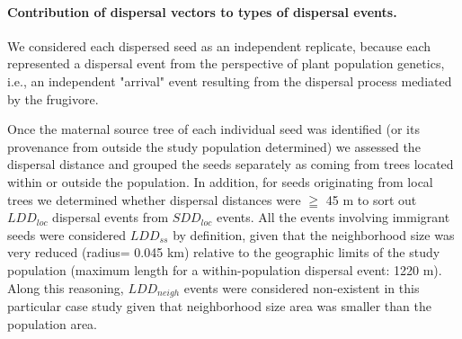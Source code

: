 \documentclass[a4paper, 12pt]{article}
\begin{document}
\begin{linenumbers}
\paragraph*{Contribution of dispersal vectors to types of dispersal events.} 
We considered each dispersed seed as an independent replicate, because each represented a dispersal event from the perspective of plant population genetics, i.e., an independent "arrival" event resulting from the dispersal process mediated by the frugivore. 

Once the maternal source tree of each individual seed was identified (or its provenance from outside the study population determined) we assessed the dispersal distance and grouped the seeds separately as coming from trees located within or outside the population. In addition, for seeds originating from local trees we determined whether dispersal distances were $\geqq$ 45 m to sort out $LDD_{loc}$ dispersal events from $SDD_{loc}$ events. All the events involving immigrant seeds were considered $LDD_{ss}$ by definition, given that the neighborhood size was very reduced (radius= 0.045 km) relative to the geographic limits of the study population (maximum length for a within-population dispersal event: 1220 m)\citep{Garcia:2009do}. Along this reasoning, $LDD_{neigh}$ events were considered non-existent in this particular case study given that neighborhood size area was smaller than the population area.

\end{linenumbers}
\newpage
\end{document}
